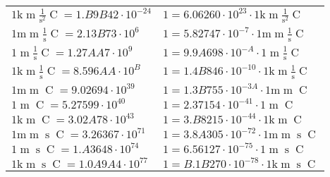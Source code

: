 \begin{center}
\begin{longtable}{l l}
{\color{gray}$1 \bm{\mathrm{ k}}{\operatorname{m}}\frac1{\operatorname{s}^2}{\operatorname{C}}{} = 1.B9B42\cdot10^{-24} $}   & {\color{gray}$ 1 = 6.06260\cdot10^{23} \cdot 1 \bm{\mathrm{ k}}{\operatorname{m}}\frac1{\operatorname{s}^2}{\operatorname{C}}{}$}  \\
{\color{gray}$1 \bm{\mathrm{ m}}{\operatorname{m}}\frac1{\operatorname{s}}{\operatorname{C}}{} = 2.13B73\cdot10^{6} $}   & {\color{gray}$ 1 = 5.82747\cdot10^{-7} \cdot 1 \bm{\mathrm{ m}}{\operatorname{m}}\frac1{\operatorname{s}}{\operatorname{C}}{}$}  \\
{\color{black}$1 \bm{\mathrm{ }}{\operatorname{m}}\frac1{\operatorname{s}}{\operatorname{C}}{} = 1.27AA7\cdot10^{9} $}   & {\color{black}$ 1 = 9.9A698\cdot10^{-A} \cdot 1 \bm{\mathrm{ }}{\operatorname{m}}\frac1{\operatorname{s}}{\operatorname{C}}{}$}  \\
{\color{gray}$1 \bm{\mathrm{ k}}{\operatorname{m}}\frac1{\operatorname{s}}{\operatorname{C}}{} = 8.596AA\cdot10^{B} $}   & {\color{gray}$ 1 = 1.4B846\cdot10^{-10} \cdot 1 \bm{\mathrm{ k}}{\operatorname{m}}\frac1{\operatorname{s}}{\operatorname{C}}{}$}  \\
{\color{gray}$1 \bm{\mathrm{ m}}{\operatorname{m}}{}{\operatorname{C}}{} = 9.02694\cdot10^{39} $}   & {\color{gray}$ 1 = 1.3B755\cdot10^{-3A} \cdot 1 \bm{\mathrm{ m}}{\operatorname{m}}{}{\operatorname{C}}{}$}  \\
{\color{black}$1 \bm{\mathrm{ }}{\operatorname{m}}{}{\operatorname{C}}{} = 5.27599\cdot10^{40} $}   & {\color{black}$ 1 = 2.37154\cdot10^{-41} \cdot 1 \bm{\mathrm{ }}{\operatorname{m}}{}{\operatorname{C}}{}$}  \\
{\color{gray}$1 \bm{\mathrm{ k}}{\operatorname{m}}{}{\operatorname{C}}{} = 3.02A78\cdot10^{43} $}   & {\color{gray}$ 1 = 3.B8215\cdot10^{-44} \cdot 1 \bm{\mathrm{ k}}{\operatorname{m}}{}{\operatorname{C}}{}$}  \\
{\color{gray}$1 \bm{\mathrm{ m}}{\operatorname{m}}{\operatorname{s}}{\operatorname{C}}{} = 3.26367\cdot10^{71} $}   & {\color{gray}$ 1 = 3.8A305\cdot10^{-72} \cdot 1 \bm{\mathrm{ m}}{\operatorname{m}}{\operatorname{s}}{\operatorname{C}}{}$}  \\
{\color{black}$1 \bm{\mathrm{ }}{\operatorname{m}}{\operatorname{s}}{\operatorname{C}}{} = 1.A3648\cdot10^{74} $}   & {\color{black}$ 1 = 6.56127\cdot10^{-75} \cdot 1 \bm{\mathrm{ }}{\operatorname{m}}{\operatorname{s}}{\operatorname{C}}{}$}  \\
{\color{gray}$1 \bm{\mathrm{ k}}{\operatorname{m}}{\operatorname{s}}{\operatorname{C}}{} = 1.0A9A4\cdot10^{77} $}   & {\color{gray}$ 1 = B.1B270\cdot10^{-78} \cdot 1 \bm{\mathrm{ k}}{\operatorname{m}}{\operatorname{s}}{\operatorname{C}}{}$}  \\

\end{longtable}
\end{center}

